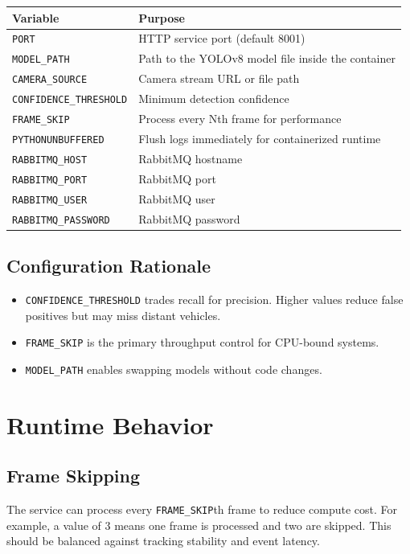 \documentclass[11pt]{article}
\begin{document}
\begin{longtable}{p{}p{}}
\textbf{Variable} & \textbf{Purpose} \\
\hline
\texttt{PORT} & HTTP service port (default 8001) \\
\texttt{MODEL\_PATH} & Path to the YOLOv8 model file inside the container \\
\texttt{CAMERA\_SOURCE} & Camera stream URL or file path \\
\texttt{CONFIDENCE\_THRESHOLD} & Minimum detection confidence \\
\texttt{FRAME\_SKIP} & Process every Nth frame for performance \\
\texttt{PYTHONUNBUFFERED} & Flush logs immediately for containerized runtime \\
\texttt{RABBITMQ\_HOST} & RabbitMQ hostname \\
\texttt{RABBITMQ\_PORT} & RabbitMQ port \\
\texttt{RABBITMQ\_USER} & RabbitMQ user \\
\texttt{RABBITMQ\_PASSWORD} & RabbitMQ password \\
\end{longtable}

\subsection*{Configuration Rationale}
\begin{itemize}
  \item \texttt{CONFIDENCE\_THRESHOLD} trades recall for precision. Higher values reduce false positives but may miss distant vehicles.
  \item \texttt{FRAME\_SKIP} is the primary throughput control for CPU-bound systems.
  \item \texttt{MODEL\_PATH} enables swapping models without code changes.
\end{itemize}

\section{Runtime Behavior}
\subsection*{Frame Skipping}
The service can process every \texttt{FRAME\_SKIP}th frame to reduce compute cost. For example, a value of 3 means one frame is processed and two are skipped. This should be balanced against tracking stability and event latency.
\end{document}
